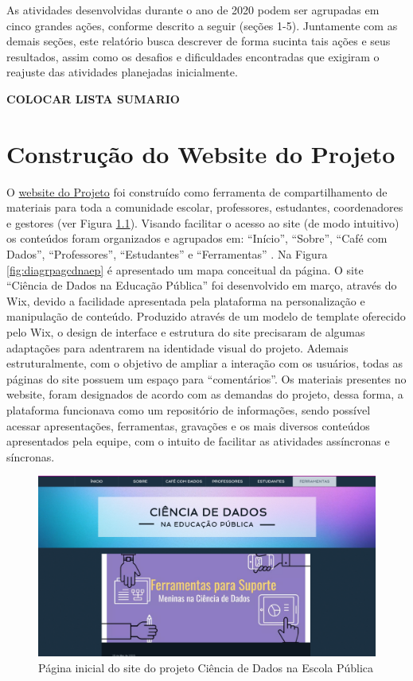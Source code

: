 \documentclass[
]{book}
\begin{document}
As atividades desenvolvidas durante o ano de 2020 podem ser agrupadas em cinco grandes ações, conforme descrito a seguir (seções 1-5). Juntamente com as demais seções, este relatório busca descrever de forma sucinta tais ações e seus resultados, assim como os desafios e dificuldades encontradas que exigiram o reajuste das atividades planejadas inicialmente.

\textbf{COLOCAR LISTA SUMARIO}

\hypertarget{construuxe7uxe3o-do-website-do-projeto}{%
\chapter{Construção do Website do Projeto}\label{construuxe7uxe3o-do-website-do-projeto}}

O \href{https://cienciadedadosep.wixsite.com/cdep/sobre}{website do Projeto} foi construído como ferramenta de compartilhamento de materiais para toda a comunidade escolar, professores, estudantes, coordenadores e gestores (ver Figura \ref{fig:pagcdnaep}). Visando facilitar o acesso ao site (de modo intuitivo) os conteúdos foram organizados e agrupados em: ``Início'', ``Sobre'', ``Café com Dados'', ``Professores'', ``Estudantes'' e ``Ferramentas'' . Na Figura \ref{fig:diagrpagcdnaep} é apresentado um mapa conceitual da página.
O site ``Ciência de Dados na Educação Pública'' foi desenvolvido em março, através do Wix, devido a facilidade apresentada pela plataforma na personalização e manipulação de conteúdo. Produzido através de um modelo de template oferecido pelo Wix, o design de interface e estrutura do site precisaram de algumas adaptações para adentrarem na identidade visual do projeto. Ademais estruturalmente, com o objetivo de ampliar a interação com os usuários, todas as páginas do site possuem um espaço para ``comentários''.
Os materiais presentes no website, foram designados de acordo com as demandas do projeto, dessa forma, a plataforma funcionava como um repositório de informações, sendo possível acessar apresentações, ferramentas, gravações e os mais diversos conteúdos apresentados pela equipe, com o intuito de facilitar as atividades assíncronas e síncronas.

\begin{figure}
\includegraphics[width=26.35in]{images/image85} \caption{Página inicial do site do projeto Ciência de Dados na Escola Pública}\label{fig:pagcdnaep}
\end{figure}
\end{document}
